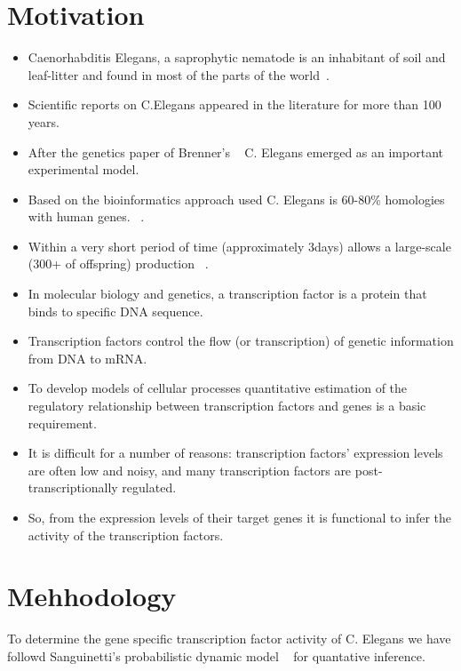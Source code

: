 \documentclass[a4paper,10pt]{report}
\begin{document}
\maketitle


\section{Motivation}
	\begin{itemize}
	  \item Caenorhabditis Elegans, a saprophytic nematode is an inhabitant of soil and leaf-litter and found 
		in most of the parts of the world~\cite{hope}.
	  \item Scientific reports on C.Elegans appeared in the literature for more than 100 years.
	  \item After the genetics paper of Brenner's ~\cite{brenner} C. Elegans emerged as an important experimental model.
	  \item Based on the bioinformatics approach used C. Elegans is 60-80\% homologies with human genes. ~\cite{kaletta}.
	  \item Within a very short period of time (approximately 3days) allows a large-scale (300+ of offspring) production ~\cite{hope}. 
	  \item In molecular biology and genetics, a transcription factor is a protein that binds to specific DNA sequence.
	  \item Transcription factors control the flow (or transcription) of genetic information from DNA to mRNA. 
	  \item To develop models of cellular processes quantitative estimation of the regulatory relationship between transcription factors and genes is a basic requirement. 
	  \item It is difficult for a number of reasons: transcription factors’ expression levels are often low and noisy, and many transcription factors are post- transcriptionally regulated. 
	  \item So, from the expression levels of their target genes it is functional to infer the activity of the transcription factors.

	\end{itemize}

\section{Mehhodology}\label{mehhodology}
To determine the gene specific transcription factor activity of C. Elegans we have followd Sanguinetti's probabilistic
dynamic model ~\cite{sanguinetti:01} for quantative inference.
\end{document}
